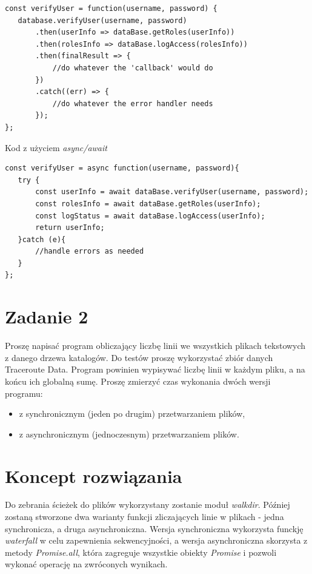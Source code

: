 \documentclass[12pt]{article}
\begin{document}
\begin{verbatim}
const verifyUser = function(username, password) {
   database.verifyUser(username, password)
       .then(userInfo => dataBase.getRoles(userInfo))
       .then(rolesInfo => dataBase.logAccess(rolesInfo))
       .then(finalResult => {
           //do whatever the 'callback' would do
       })
       .catch((err) => {
           //do whatever the error handler needs
       });
};
\end{verbatim}

\newpage
\noindent
Kod z użyciem \emph{async/await}

\begin{verbatim}
const verifyUser = async function(username, password){
   try {
       const userInfo = await dataBase.verifyUser(username, password);
       const rolesInfo = await dataBase.getRoles(userInfo);
       const logStatus = await dataBase.logAccess(userInfo);
       return userInfo;
   }catch (e){
       //handle errors as needed
   }
};
\end{verbatim}


\section{Zadanie 2}
Proszę napisać program obliczający liczbę linii we wszystkich plikach tekstowych z danego drzewa katalogów. Do testów proszę wykorzystać zbiór danych Traceroute Data. Program powinien wypisywać liczbę linii w każdym pliku, a na końcu ich globalną sumę. Proszę zmierzyć czas wykonania dwóch wersji programu:
\begin{itemize}
    \item z synchronicznym (jeden po drugim) przetwarzaniem plików,
    \item z asynchronicznym (jednoczesnym) przetwarzaniem plików.
\end{itemize}


\section{Koncept rozwiązania}
Do zebrania ścieżek do plików wykorzystany zostanie moduł \emph{walkdir}. Później zostaną stworzone dwa warianty funkcji zliczających linie w plikach - jedna synchronicza, a druga asynchroniczna.
Wersja synchroniczna wykorzysta funckję \emph{waterfall} w celu zapewnienia sekwencyjności, a wersja asynchroniczna skorzysta z metody \emph{Promise.all}, która zagreguje wszystkie obiekty \emph{Promise} i pozwoli wykonać operację na zwróconych wynikach.
\end{document}
